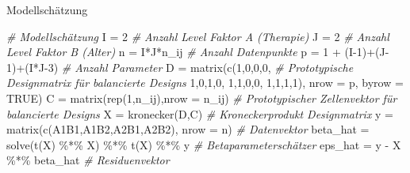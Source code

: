 \documentclass[
  8pt,
  ignorenonframetext,
]{beamer}
\newenvironment{Shaded}{\begin{snugshade}}{\end{snugshade}}
\newcommand{\AttributeTok}[1]{\textcolor[rgb]{0.77,0.63,0.00}{#1}}
\newcommand{\CommentTok}[1]{\textcolor[rgb]{0.56,0.35,0.01}{\textit{#1}}}
\newcommand{\ConstantTok}[1]{\textcolor[rgb]{0.00,0.00,0.00}{#1}}
\newcommand{\DecValTok}[1]{\textcolor[rgb]{0.00,0.00,0.81}{#1}}
\newcommand{\FunctionTok}[1]{\textcolor[rgb]{0.00,0.00,0.00}{#1}}
\newcommand{\NormalTok}[1]{#1}
\newcommand{\OtherTok}[1]{\textcolor[rgb]{0.56,0.35,0.01}{#1}}
\newcommand{\SpecialCharTok}[1]{\textcolor[rgb]{0.00,0.00,0.00}{#1}}
\begin{document}
\begin{frame}[fragile]{Modellschätzung}
\begin{Shaded}
\begin{Highlighting}[]
\CommentTok{\# Modellschätzung}
\NormalTok{I          }\OtherTok{=} \DecValTok{2}                                               \CommentTok{\# Anzahl Level Faktor A (Therapie)}
\NormalTok{J          }\OtherTok{=} \DecValTok{2}                                               \CommentTok{\# Anzahl Level Faktor B (Alter)}
\NormalTok{n          }\OtherTok{=}\NormalTok{ I}\SpecialCharTok{*}\NormalTok{J}\SpecialCharTok{*}\NormalTok{n\_ij                                        }\CommentTok{\# Anzahl Datenpunkte}
\NormalTok{p          }\OtherTok{=} \DecValTok{1} \SpecialCharTok{+}\NormalTok{ (I}\DecValTok{{-}1}\NormalTok{)}\SpecialCharTok{+}\NormalTok{(J}\DecValTok{{-}1}\NormalTok{)}\SpecialCharTok{+}\NormalTok{(I}\SpecialCharTok{*}\NormalTok{J}\DecValTok{{-}3}\NormalTok{)                         }\CommentTok{\# Anzahl Parameter}
\NormalTok{D          }\OtherTok{=} \FunctionTok{matrix}\NormalTok{(}\FunctionTok{c}\NormalTok{(}\DecValTok{1}\NormalTok{,}\DecValTok{0}\NormalTok{,}\DecValTok{0}\NormalTok{,}\DecValTok{0}\NormalTok{,                               }\CommentTok{\# Prototypische Designmatrix für balancierte Designs}
                      \DecValTok{1}\NormalTok{,}\DecValTok{0}\NormalTok{,}\DecValTok{1}\NormalTok{,}\DecValTok{0}\NormalTok{,}
                      \DecValTok{1}\NormalTok{,}\DecValTok{1}\NormalTok{,}\DecValTok{0}\NormalTok{,}\DecValTok{0}\NormalTok{,}
                      \DecValTok{1}\NormalTok{,}\DecValTok{1}\NormalTok{,}\DecValTok{1}\NormalTok{,}\DecValTok{1}\NormalTok{), }\AttributeTok{nrow =}\NormalTok{ p, }\AttributeTok{byrow =} \ConstantTok{TRUE}\NormalTok{)}
\NormalTok{C          }\OtherTok{=} \FunctionTok{matrix}\NormalTok{(}\FunctionTok{rep}\NormalTok{(}\DecValTok{1}\NormalTok{,n\_ij),}\AttributeTok{nrow =}\NormalTok{ n\_ij)                 }\CommentTok{\# Prototypischer Zellenvektor für balancierte Designs}
\NormalTok{X          }\OtherTok{=} \FunctionTok{kronecker}\NormalTok{(D,C)                                  }\CommentTok{\# Kroneckerprodukt Designmatrix}
\NormalTok{y          }\OtherTok{=} \FunctionTok{matrix}\NormalTok{(}\FunctionTok{c}\NormalTok{(A1B1,A1B2,A2B1,A2B2), }\AttributeTok{nrow =}\NormalTok{ n)        }\CommentTok{\# Datenvektor}
\NormalTok{beta\_hat   }\OtherTok{=} \FunctionTok{solve}\NormalTok{(}\FunctionTok{t}\NormalTok{(X) }\SpecialCharTok{\%*\%}\NormalTok{ X) }\SpecialCharTok{\%*\%} \FunctionTok{t}\NormalTok{(X) }\SpecialCharTok{\%*\%}\NormalTok{ y                }\CommentTok{\# Betaparameterschätzer}
\NormalTok{eps\_hat    }\OtherTok{=}\NormalTok{ y }\SpecialCharTok{{-}}\NormalTok{ X }\SpecialCharTok{\%*\%}\NormalTok{ beta\_hat                              }\CommentTok{\# Residuenvektor}

\end{Highlighting}
\end{Shaded}
\end{frame}
\end{document}
